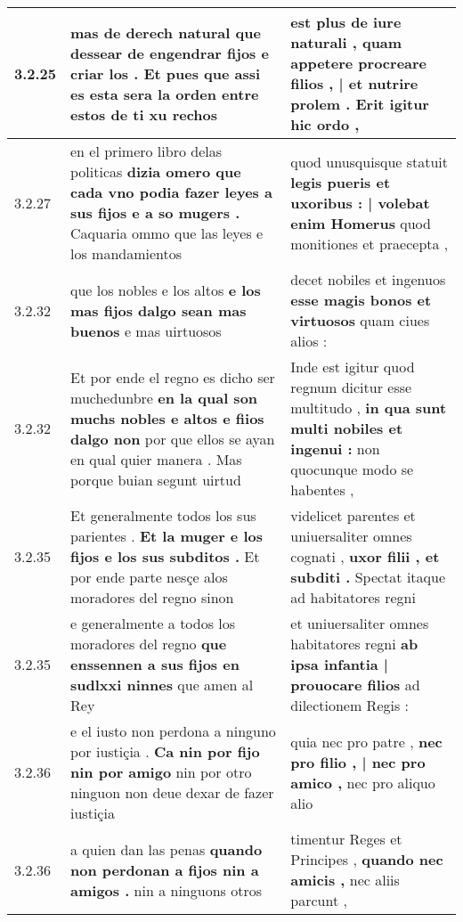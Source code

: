 \begin{tabular}{|p{1cm}|p{6.5cm}|p{6.5cm}|}
3.2.25 & mas de derech natural \textbf{ que dessear de engendrar fijos e criar los . } Et pues que assi es esta sera la orden entre estos de ti xu rechos & est plus de iure naturali , \textbf{ quam appetere procreare filios , | et nutrire prolem . } Erit igitur hic ordo , \\\hline
3.2.27 & en el primero libro delas politicas \textbf{ dizia omero que cada vno podia fazer leyes a sus fijos e a so mugers . } Caquaria ommo que las leyes e los mandamientos & quod unusquisque statuit \textbf{ legis pueris et uxoribus : | volebat enim Homerus } quod monitiones et praecepta , \\\hline
3.2.32 & que los nobles e los altos \textbf{ e los mas fijos dalgo sean mas buenos } e mas uirtuosos & decet nobiles et ingenuos \textbf{ esse magis bonos et virtuosos } quam ciues alios : \\\hline
3.2.32 & Et por ende el regno es dicho ser muchedunbre \textbf{ en la qual son muchs nobles e altos e fiios dalgo non } por que ellos se ayan en qual quier manera . Mas porque buian segunt uirtud & Inde est igitur quod regnum dicitur esse multitudo , \textbf{ in qua sunt multi nobiles et ingenui : } non quocunque modo se habentes , \\\hline
3.2.35 & Et generalmente todos los sus parientes . \textbf{ Et la muger e los fijos e los sus subditos . } Et por ende parte nesçe alos moradores del regno sinon & videlicet parentes et uniuersaliter omnes cognati , \textbf{ uxor filii , et subditi . } Spectat itaque ad habitatores regni \\\hline
3.2.35 & e generalmente a todos los moradores del regno \textbf{ que enssennen a sus fijos en sudlxxi ninnes } que amen al Rey & et uniuersaliter omnes habitatores regni \textbf{ ab ipsa infantia | prouocare filios } ad dilectionem Regis : \\\hline
3.2.36 & e el iusto non perdona a ninguno por iustiçia . \textbf{ Ca nin por fijo nin por amigo } nin por otro ninguon non deue dexar de fazer iustiçia & quia nec pro patre , \textbf{ nec pro filio , | nec pro amico , } nec pro aliquo alio \\\hline
3.2.36 & a quien dan las penas \textbf{ quando non perdonan a fijos nin a amigos . } nin a ninguons otros & timentur Reges et Principes , \textbf{ quando nec amicis , } nec aliis parcunt , \\\hline

\end{tabular}
